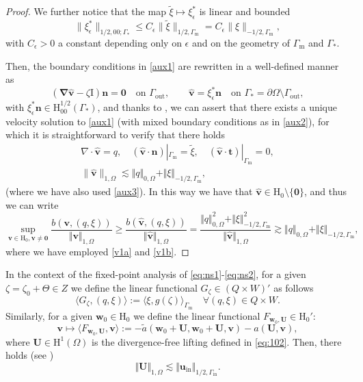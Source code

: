 \documentclass[onefignum,onetabnum,reqno,a4paper,final]{siamart250211}
\def\O{\Omega}
\newcommand\bv{\boldsymbol{v}}
\newcommand\bn{\boldsymbol{n}}
\newcommand\bw{\boldsymbol{w}}
\newcommand\0{\mathbf{0}}
\newcommand\bU{\boldsymbol{U}}
\newcommand{\bt}{\boldsymbol{t}}
\newcommand\bH{\boldsymbol{\mathrm{H}}}
\newcommand\bI{\boldsymbol{\mathrm{I}}}
\renewcommand\O{\Omega}
\newcommand\Gm{\Gamma_{\mathrm{m}}}
\newcommand\Gi{\Gamma_{\mathrm{in}}}
\newcommand\Go{\Gamma_{\mathrm{out}}}
\newcommand\buin{\boldsymbol{u}_{\mathrm{in}}}
\numberwithin{figure}{section}
\numberwithin{table}{section}
\begin{document}
\begin{proof}
 We further notice that the map $\tilde{\xi}\mapsto \xi_{\epsilon}^*$ is linear and bounded
 \begin{equation}\label{aux3} \| \xi_{\epsilon}^*\|_{1/2,00;\Gamma_*} \leq C_{\epsilon} \| \tilde{\xi}\|_{1/2,\Gm} =  C_{\epsilon} \|\xi\|_{-1/2,\Gm}, \end{equation}
 with $C_{\epsilon}>0$ a constant depending only on $\epsilon$ and on the geometry of $\Gm$ and $\Gamma_*$.
 
 Then, the  boundary conditions in \eqref{aux1} are rewritten in a well-defined manner as 
 \begin{equation}\label{aux2} 
 (\boldsymbol{\nabla}\hat{\bv} - \zeta\bI)\bn  = \boldsymbol{0} \quad \text{on } \Go, \qquad 
  \hat{\bv} = \xi_{\epsilon}^*\bn \quad \text{on } \Gamma_* = \partial\Omega \setminus \Go,\end{equation}
with $\xi_{\epsilon}^* \bn \in \bH^{1/2}_{00}(\Gamma_*)$, and thanks    
to \cite{girault1979finite}, we can assert that there exists a unique velocity solution to \eqref{aux1} (with mixed boundary conditions   as in \eqref{aux2}), for which it is straightforward to verify that there holds  
	\begin{subequations}
		\begin{gather}\label{v1a}
			\nabla\cdot\hat{\bv} =  q, \quad (\hat{\bv}\cdot\bn)|_{\Gm} = \tilde\xi, \quad (\hat{\bv}\cdot\bt)|_{\Gm} = 0,\\ 
			\|\hat{\bv}\|_{1,\Omega}\lesssim \Vert q\Vert_{0,\Omega}+\Vert \xi\Vert_{-1/2,\Gm}, \label{v1b}
		\end{gather}
	\end{subequations}
(where we have also used \eqref{aux3}). In this way we have that  $\hat{\bv} \in  \bH_0\setminus\{\boldsymbol{0}\}$, and thus we  can write 
	$$
		\sup_{\bv\in \bH_0,\bv\neq\boldsymbol{0}}\frac{b(\bv,(q,\xi))}{\Vert\bv\Vert_{1,\Omega}}\geq 
		\frac{b(\hat{\bv},(q,\xi))}{\Vert\hat{\bv}\Vert_{1,\Omega}}
		=  \frac{\Vert q\Vert^2_{0,\Omega}+\Vert \xi\Vert^2_{-1/2,\Gm}}{\Vert\hat{\bv}\Vert_{1,\Omega}}
		\gtrsim \Vert q\Vert_{0,\Omega}+\Vert \xi\Vert_{-1/2,\Gm},
	$$
	where we have employed \eqref{v1a} and \eqref{v1b}. 
\end{proof}

In the context of the fixed-point analysis of \eqref{eq:ns1}-\eqref{eq:ns2}, for a given $\zeta = \zeta_0 + \Theta \in Z$ we define the linear functional $G_\zeta\in (Q\times W)'$ as follows
\[\langle G_\zeta, (q,\xi)\rangle := \langle \xi, g(\zeta)\rangle_{\Gm} \quad \forall (q,\xi)\in Q\times W.\]
Similarly, for a given $\bw_0\in \bH_0$ we define the linear functional $F_{\bw_0,\bU}\in \bH_0'$:
$$
\bv \mapsto \langle F_{\bw_0,\bU}, \bv\rangle := - \tilde{a}(\bw_0 + \bU, \bw_0 + \bU, \bv) - a(\bU,\bv),
$$
where $\bU\in\bH^1(\Omega)$ is the divergence-free lifting defined in \eqref{eq:102}. 
Then, there holds (see \cite[Lemma 16]{cocquet2021error}) 
\begin{equation}
	\label{eq:103}
	\Vert \bU\Vert_{1,\O}\lesssim \Vert \buin\Vert_{1/2,\Gi}.
\end{equation}
\end{document}
